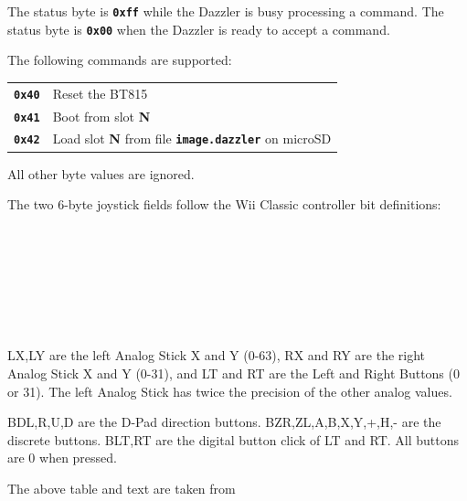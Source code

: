\documentclass{article}
\newcommand{\mach}[1]{\texttt{\textbf{#1}}}
\newcommand{\gap}{\vspace{10pt}}
\begin{document}
The status byte is \mach{0xff} while the Dazzler is busy processing a command.
The status byte is \mach{0x00}
when the Dazzler is ready to accept a command.

The following commands are supported:

\gap
\begin{tabular}{ll}

\mach{0x40}	& Reset the BT815 \\
\mach{0x41}	& Boot from slot \textbf{N} \\
\mach{0x42}	& Load slot \textbf{N} from file \mach{image.dazzler} on microSD \\

\end{tabular}
\gap

All other byte values are ignored.

The two 6-byte joystick fields follow the Wii Classic controller bit definitions:

\gap
\begin{bytefield}[endianness=big,bitwidth=3.2em]{10}
  \\
  \\
   \\
  \\
\\
\\
\end{bytefield}

LX,LY are the left Analog Stick X and Y (0-63), RX and RY are the right Analog Stick X and Y (0-31), and LT and RT are the Left and Right Buttons (0 or 31). The left Analog Stick has twice the precision of the other analog values.

BD{L,R,U,D} are the D-Pad direction buttons. B{ZR,ZL,A,B,X,Y,+,H,-} are the discrete buttons. B{LT,RT} are the digital button click of LT and RT. All buttons are 0 when pressed.

The above table and text are taken from
\end{document}
